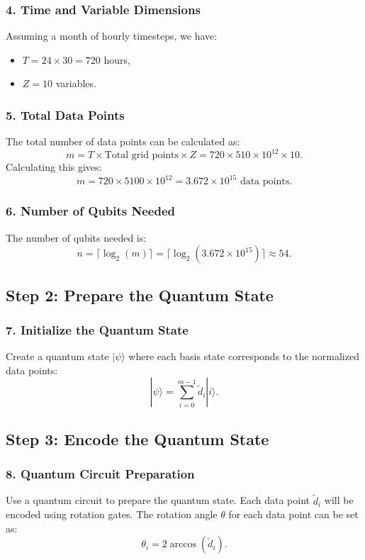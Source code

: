 \documentclass{article}
\begin{document}
\subsubsection{4. Time and Variable Dimensions}
Assuming a month of hourly timesteps, we have:
\begin{itemize}
    \item \( T = 24 \times 30 = 720 \) hours,
    \item \( Z = 10 \) variables.
\end{itemize}

\subsubsection{5. Total Data Points}
The total number of data points can be calculated as:
\[
m = T \times \text{Total grid points} \times Z = 720 \times 510 \times 10^{12} \times 10.
\]
Calculating this gives:
\[
m = 720 \times 5100 \times 10^{12} = 3.672 \times 10^{15} \text{ data points}.
\]

\subsubsection{6. Number of Qubits Needed}
The number of qubits needed is:
\[
n = \lceil \log_2(m) \rceil = \lceil \log_2(3.672 \times 10^{15}) \rceil \approx 54.
\]

\subsection{Step 2: Prepare the Quantum State}

\subsubsection{7. Initialize the Quantum State}
Create a quantum state \( |\psi\rangle \) where each basis state corresponds to the normalized data points:
\[
|\psi\rangle = \sum_{i=0}^{m-1} \tilde{d}_i |i\rangle.
\]

\subsection{Step 3: Encode the Quantum State}

\subsubsection{8. Quantum Circuit Preparation}
Use a quantum circuit to prepare the quantum state. Each data point \( \tilde{d}_i \) will be encoded using rotation gates. The rotation angle \( \theta \) for each data point can be set as:
\[
\theta_i = 2 \arccos(\tilde{d}_i).
\]
\end{document}

